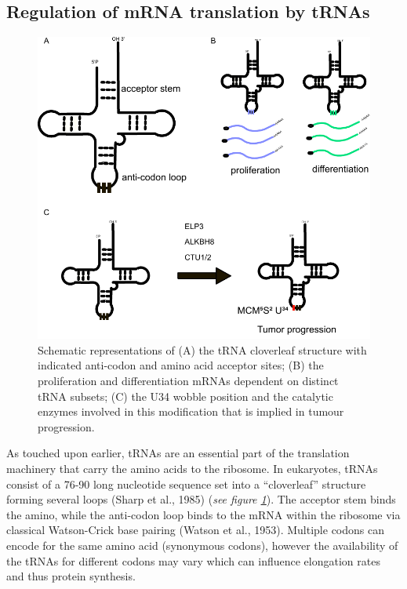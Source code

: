 \documentclass[
  12pt,
  openany]{book}
\begin{document}
\subsection{Regulation of mRNA translation by tRNAs} \label{tRNA}
\begin{figure}
  \includegraphics{./figures/tRNA.pdf}
  \caption{ Schematic representations of (A) the tRNA cloverleaf structure with indicated anti-codon and amino acid acceptor sites;  (B)  the proliferation and differentiation mRNAs dependent on distinct tRNA subsets; (C) the U34 wobble position and the catalytic enzymes involved in this modification that is implied in tumour progression.
 \label{fig:tRNA}}
\end{figure}

As touched upon earlier, tRNAs are an essential part of the translation machinery that carry the amino acids to the ribosome. In eukaryotes, tRNAs consist of a 76-90 long nucleotide sequence set into a ``cloverleaf'' structure forming several loops (Sharp et al., 1985) (\emph{see figure \ref{fig:tRNA}}). The acceptor stem binds the amino, while the anti-codon loop binds to the mRNA within the ribosome via classical Watson-Crick base pairing (Watson et al., 1953). Multiple codons can encode for the same amino acid (synonymous codons), however the availability of the tRNAs for different codons may vary which can influence elongation rates and thus protein synthesis.
\end{document}
